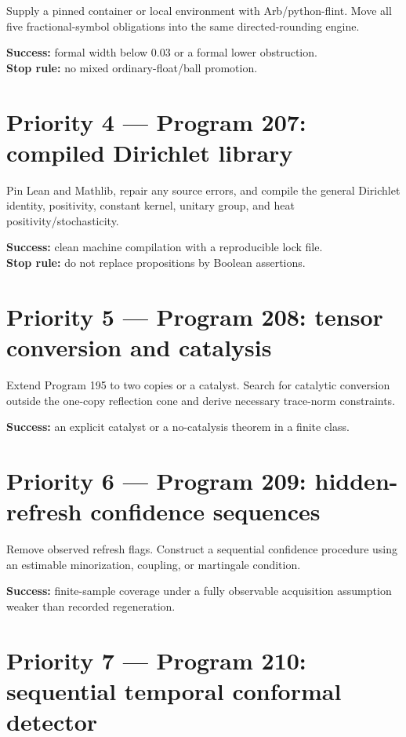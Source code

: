 \documentclass[11pt,a4paper,openany]{report}
\begin{document}
Supply a pinned container or local environment with Arb/\allowbreak{}python-flint. Move all five fractional-symbol obligations into the same directed-rounding engine.

\textbf{Success:} formal width below 0.03 or a formal lower obstruction.\\
\textbf{Stop rule:} no mixed ordinary-float/\allowbreak{}ball promotion.

\section{Priority 4 --- Program 207: compiled Dirichlet library}

Pin Lean and Mathlib, repair any source errors, and compile the general Dirichlet identity, positivity, constant kernel, unitary group, and heat positivity/\allowbreak{}stochasticity.

\textbf{Success:} clean machine compilation with a reproducible lock file.\\
\textbf{Stop rule:} do not replace propositions by Boolean assertions.

\section{Priority 5 --- Program 208: tensor conversion and catalysis}

Extend Program 195 to two copies or a catalyst. Search for catalytic conversion outside the one-copy reflection cone and derive necessary trace-norm constraints.

\textbf{Success:} an explicit catalyst or a no-catalysis theorem in a finite class.

\section{Priority 6 --- Program 209: hidden-refresh confidence sequences}

Remove observed refresh flags. Construct a sequential confidence procedure using an estimable minorization, coupling, or martingale condition.

\textbf{Success:} finite-sample coverage under a fully observable acquisition assumption weaker than recorded regeneration.

\section{Priority 7 --- Program 210: sequential temporal conformal detector}
\end{document}
